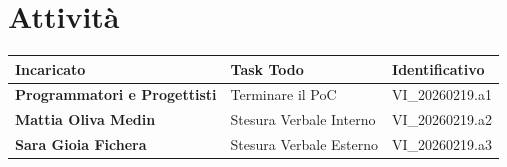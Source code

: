 \documentclass[a4paper,12pt]{article}
\begin{document}
    \section{Attività} {
        \begin{tabularx}{\textwidth}{|l|X|l|}
            \hline
            \textbf{Incaricato} & \textbf{Task Todo} & \textbf{Identificativo} \\
            \hline
            \textbf{Programmatori e Progettisti} & Terminare il PoC & VI\_20260219.a1\\
            \textbf{Mattia Oliva Medin} & Stesura Verbale Interno & VI\_20260219.a2\\
            \textbf{Sara Gioia Fichera} & Stesura Verbale Esterno & VI\_20260219.a3\\
            \hline
        \end{tabularx}
    }
\end{document}
